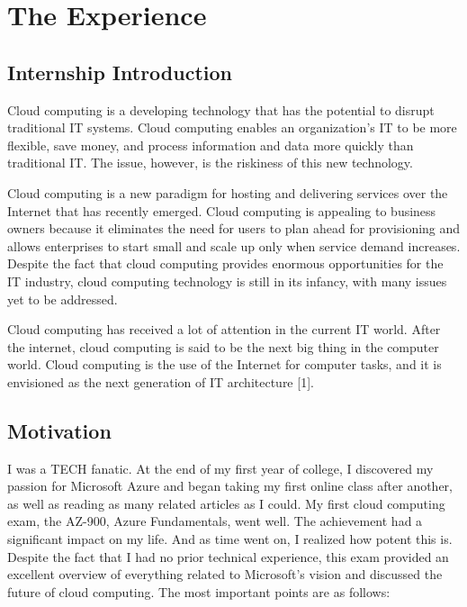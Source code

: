 \chapter{The Experience}

\section{Internship Introduction}
Cloud computing is a developing technology that has the potential to disrupt traditional IT systems. Cloud computing enables an organization's IT to be more flexible, save money, and process information and data more quickly than traditional IT. The issue, however, is the riskiness of this new technology.

Cloud computing is a new paradigm for hosting and delivering services over the Internet that has recently emerged. Cloud computing is appealing to business owners because it eliminates the need for users to plan ahead for provisioning and allows enterprises to start small and scale up only when service demand increases. Despite the fact that cloud computing provides enormous opportunities for the IT industry, cloud computing technology is still in its infancy, with many issues yet to be addressed.
\newline

Cloud computing has received a lot of attention in the current IT world. After the internet, cloud computing is said to be the next big thing in the computer world. Cloud computing is the use of the Internet for computer tasks, and it is envisioned as the next generation of IT architecture [1].

\section{Motivation}

I was a TECH fanatic. At the end of my first year of college, I discovered my passion for Microsoft Azure and began taking my first online class after another, as well as reading as many related articles as I could. My first cloud computing exam, the AZ-900, Azure Fundamentals, went well. The achievement had a significant impact on my life. And as time went on, I realized how potent this is. Despite the fact that I had no prior technical experience, this exam provided an excellent overview of everything related to Microsoft's vision and discussed the future of cloud computing. The most important points are as follows:

